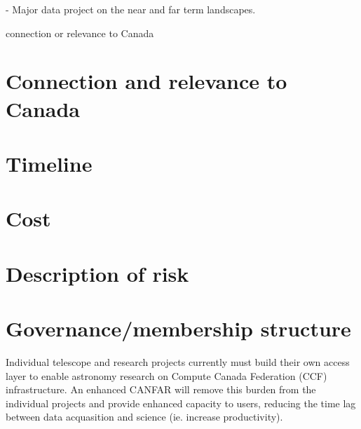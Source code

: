 \documentclass[11pt]{article}
\begin{document}
 -  Major data project on the near and far term landscapes.



connection or relevance to Canada

\section{Connection and relevance to Canada}
\section{Timeline}
\section{Cost}
\section{Description of risk}
\section{Governance/membership structure}









\begin{lrptextbox}
Individual telescope and research projects currently must build their own access layer to enable astronomy research on Compute Canada Federation (CCF) infrastructure.  An enhanced CANFAR will remove this burden from the individual projects and provide enhanced capacity to users, reducing the time lag between data acquasition and science (ie. increase productivity).
\end{lrptextbox}
\end{document}
